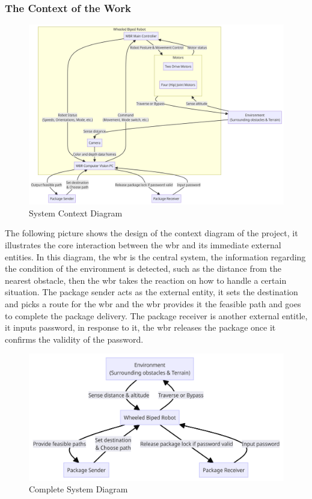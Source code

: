 \documentclass[12pt]{article}
\begin{document}
\subsubsection{The Context of the Work}
\begin{figure}[H]
    \centering
    \includegraphics[width=\textwidth,height=\textheight,keepaspectratio]{../System Context Diagram.png}
    \caption{System Context Diagram}
\end{figure}
The following picture shows the design of the context diagram of the project, it illustrates the core interaction between the \acrshort{wbr} and its immediate external entities. In this diagram, the \acrshort{wbr} is the central system, the information regarding the condition of the environment is detected, such as the distance from the nearest obstacle, then the \acrshort{wbr} takes the reaction on how to handle a certain situation. The package sender acts as the external entity, it sets the destination and picks a route for the \acrshort{wbr} and the \acrshort{wbr} provides it the feasible path and goes to complete the package delivery. The package receiver is another external entitle, it inputs password, in response to it, the \acrshort{wbr} releases the package once it confirms the validity of the password.
\begin{figure}[H]
    \centering
    \includegraphics[width=\textwidth,height=\textheight,keepaspectratio]{../Complete System Diagram.png}
    \caption{Complete System Diagram}
\end{figure}
\end{document}

